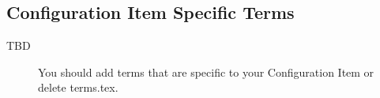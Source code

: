\subsection{Configuration Item Specific Terms}
\begin{description}
\item[TBD] \quad You should add terms that are specific to your Configuration
  Item or delete terms.tex.
\end{description}
